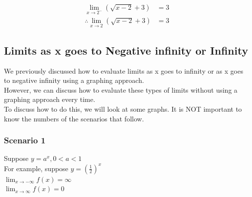 \documentclass{article}
\begin{document}
\hfill
\begin{minipage}[t]{0.4\textwidth}
    \vspace{0pt}
    \begin{align*}
        \lim_{x \to 2^-}\left(\sqrt{x-2}+3\right) &= 3 \\
        \therefore \lim_{x \to 2}\left(\sqrt{x-2}+3\right) &= 3
    \end{align*}
\end{minipage}
\newpage 
\subsection{Limits as x goes to Negative infinity or Infinity}
We previously discussed how to evaluate limits as x goes to infinity or as x goes to negative infinity using a graphing approach.\\
However, we can discuss how to evaluate these types of limits without using a graphing approach every time.\\
To discuss how to do this, we will look at some graphs.
It is NOT important to know the numbers of the scenarios that follow.

\subsubsection{Scenario 1}
\begin{minipage}[t]{0.5\textwidth}
    \vspace{0pt}
    Suppose $y=a^x, 0 <a<1$\\
    For example, suppose $y=\left(\frac{1}{2}\right)^x$\\
    $\lim_{x \to -\infty}f(x)=\infty$\\
    $\lim_{x \to \infty}f(x)=0$
\end{minipage}
\begin{minipage}[t]{0.45\textwidth}
    \vspace{0pt}
\end{minipage}
\end{document}
